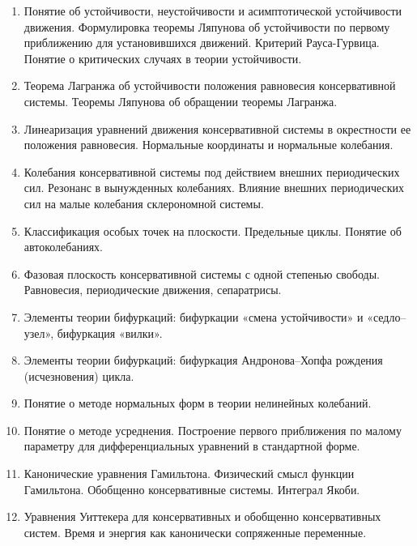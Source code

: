  \begin{enumerate}
 \item Понятие об устойчивости, неустойчивости и асимптотической устойчивости движения. Формулировка теоремы Ляпунова об устойчивости по первому приближению для установившихся движений. Критерий Рауса-Гурвица. Понятие о критических случаях в теории устойчивости.

\item Теорема Лагранжа об устойчивости положения равновесия консервативной системы. Теоремы Ляпунова об обращении теоремы Лагранжа.

\item Линеаризация уравнений движения консервативной системы в окрестности ее положения равновесия. Нормальные координаты и нормальные колебания.

\item Колебания консервативной системы под действием внешних периодических сил. Резонанс в вынужденных колебаниях. Влияние внешних периодических сил на малые колебания склерономной системы.

\item Классификация особых точек на плоскости. Предельные циклы. Понятие об автоколебаниях.

\item Фазовая плоскость консервативной системы с одной степенью свободы. Равновесия, периодические движения, сепаратрисы.

\item Элементы теории бифуркаций: бифуркации «смена устойчивости» и «седло–узел», бифуркация «вилки».

\item Элементы теории бифуркаций: бифуркация Андронова–Хопфа рождения (исчезновения) цикла.

\item Понятие о методе нормальных форм в теории нелинейных колебаний.

\item Понятие о методе усреднения. Построение первого приближения по малому параметру для дифференциальных уравнений в стандартной форме.

\item Канонические уравнения Гамильтона. Физический смысл функции Гамильтона. Обобщенно консервативные системы. Интеграл Якоби.

\item Уравнения Уиттекера для консервативных и обобщенно консервативных систем. Время и энергия как канонически сопряженные переменные.


\end{enumerate}
